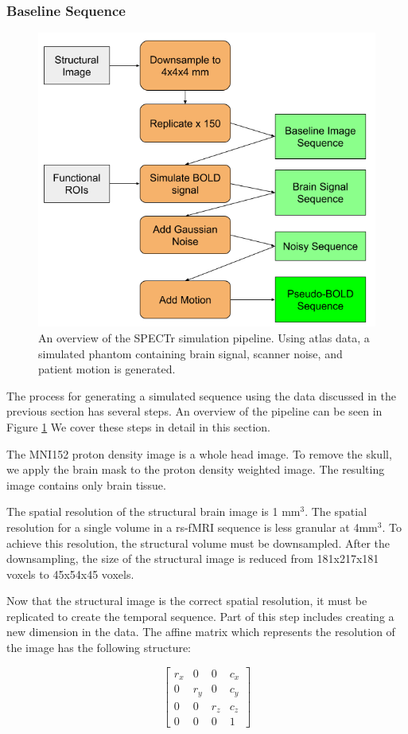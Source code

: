 \subsubsection{Baseline Sequence}

\begin{figure}
\centering
\includegraphics[width=.6\textwidth]{5/pipeline.png}
\caption{An overview of the SPECTr simulation pipeline. Using atlas data, a simulated phantom containing brain signal, scanner noise, and patient motion is generated.}
\label{ch5:spectr_flow}
\end{figure}

The process for generating a simulated sequence using the data discussed in the previous section has several steps. An overview of the pipeline can be seen in Figure \ref{ch5:spectr_flow} We cover these steps in detail in this section.

The MNI152 proton density image is a whole head image. To remove the skull, we apply the brain mask to the proton density weighted image. The resulting image contains only brain tissue.

The spatial resolution of the structural brain image is 1 mm$^3$. The spatial resolution for a single volume in a rs-fMRI sequence is less granular at 4mm$^3$. To achieve this resolution, the structural volume must be downsampled. After the downsampling, the size of the structural image is reduced from 181x217x181 voxels to 45x54x45 voxels. 

Now that the structural image is the correct spatial resolution, it must be replicated to create the temporal sequence. Part of this step includes creating a new dimension in the data. The affine matrix which represents the resolution of the image has the following structure:

\begin{equation}
\begin{bmatrix}
 r_x &  0   &  0   & c_x\\ 
 0   &  r_y &  0   & c_y \\ 
 0   &  0   &  r_z & c_z \\ 
 0   &  0   &  0   & 1 
\end{bmatrix}
\end{equation}

